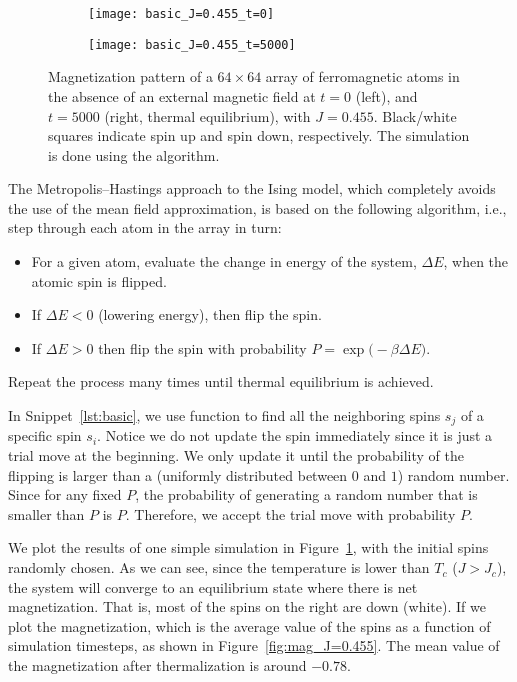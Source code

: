 \begin{figure}[hbt]
    \centering
    \begin{subfigure}{0.49\textwidth}
        \centering
        \texttt{[image: basic\_J=0.455\_t=0]}
    \end{subfigure}
    \hfill
    \begin{subfigure}{0.49\textwidth}
        \centering
        \texttt{[image: basic\_J=0.455\_t=5000]}
    \end{subfigure}
    \caption{Magnetization pattern of a \(64 \times 64\) array of ferromagnetic atoms in the
        absence of an external magnetic field at \(t = 0\) (left), and \(t = 5000\) (right,
        thermal equilibrium), with \(J = 0.455\). Black/white squares indicate spin up and
        spin down, respectively. The simulation is done using the  algorithm.}
    \label{fig:rand_J=0.455}
\end{figure}

The Metropolis--Hastings approach to the Ising model, which completely avoids the use of the mean
field approximation, is based on the following algorithm, i.e.,
step through each atom in the array in turn:
%
\begin{itemize}
    \item For a given atom, evaluate the change in energy of the system, \(\Delta E\), when
          the atomic spin is flipped.
    \item If \(\Delta E < 0\) (lowering energy), then flip the spin.
    \item If \(\Delta E > 0\) then flip the spin with probability
          \(P=\exp\bigl(-\beta \Delta E\bigr)\).
\end{itemize}
%
Repeat the process many times until thermal equilibrium is achieved.

In Snippet~\ref{lst:basic}, we use function  to find all the neighboring
spins \(s_j\) of a specific spin \(s_i\). Notice we do not update the spin immediately
since it is just a trial move at the beginning. We only update it until the probability of
the flipping is larger than a (uniformly distributed between \(0\) and \(1\)) random number.
Since for any fixed \(P\), the probability of generating a random number that is smaller
than \(P\) is \(P\). Therefore, we accept the trial move with probability \(P\).

We plot the results of one simple simulation in Figure~\ref{fig:rand_J=0.455},
with the initial spins randomly chosen.
As we can see, since the temperature is lower than \(T_c\) (\(J > J_c\)),
the system will converge to an equilibrium state where there is net magnetization.
That is, most of the spins on the right are down (white).
If we plot the magnetization, which is the average value of the spins as a function
of simulation timesteps, as shown in Figure~\ref{fig:mag_J=0.455}.
The mean value of the magnetization after thermalization is around \(-0.78\).

